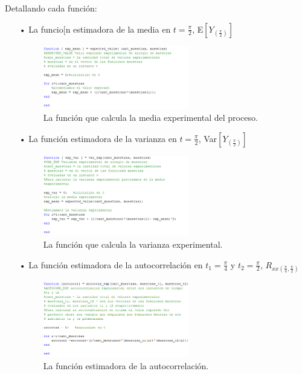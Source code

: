 Detallando cada función:
\begin{enumerate}
\item[•] La funcio[n estimadora de la media en $t = \frac{\pi}{2}$, E$\left[ Y_{(\frac{\pi}{2})}\right]$
\begin{figure}[H]
\centering
	\includegraphics[width=0.6\textwidth, trim = {0 0 0 0},clip]{./ImagenesEjercicio1/expval.png}
	\caption{La función que calcula la media experimental del proceso.}
	\label{fig:expval}
\end{figure}

\item[•] La función estimadora de la varianza en $t = \frac{\pi}{2}$, Var$\left[Y_{(\frac{\pi}{2})}\right]$
\begin{figure}[H]
\centering
	\includegraphics[width=0.6\textwidth, trim = {0 0 0 0},clip]{./ImagenesEjercicio1/expvar.png}
	\caption{La función que calcula la varianza experimental.}
	\label{fig:expvar}
\end{figure}

\item[•] La función estimadora de la autocorrelación en $t_1 = \frac{\pi}{4}$ y $t_2 = \frac{\pi}{2}$, $R_{xx(\frac{\pi}{4},\frac{\pi}{2})}$
\begin{figure}[H]
\centering
	\includegraphics[width=0.6\textwidth, trim = {0 0 0 0},clip]{./ImagenesEjercicio1/autocorr.png}
	\caption{La función estimadora de la autocorrelación.}
	\label{fig:autocorr}
\end{figure}


\end{enumerate}
